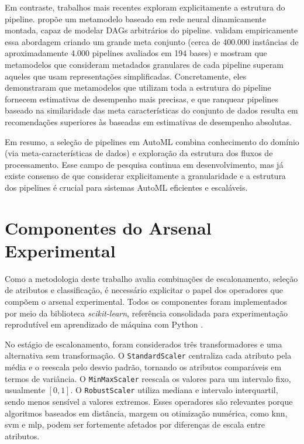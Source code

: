 Em contraste, trabalhos mais recentes exploram explicitamente a estrutura do pipeline.  propõe um metamodelo baseado em rede neural dinamicamente montada, capaz de modelar DAGs arbitrários do pipeline.  validam empiricamente essa abordagem criando um grande meta conjunto (cerca de 400.000 instâncias de aproximadamente 4.000 pipelines avaliados em 194 bases) e mostram que metamodelos que consideram metadados granulares de cada pipeline superam aqueles que usam representações simplificadas. Concretamente, eles demonstraram que metamodelos que utilizam toda a estrutura do pipeline fornecem estimativas de desempenho mais precisas, e que ranquear pipelines baseado na similaridade das meta características do conjunto de dados resulta em recomendações superiores às baseadas em estimativas de desempenho absolutas. 

Em resumo, a seleção de pipelines em AutoML combina conhecimento do domínio (via meta-características de dados) e exploração da estrutura dos fluxos de processamento. Esse campo de pesquisa continua em desenvolvimento, mas já existe consenso de que considerar explicitamente a granularidade e a estrutura dos pipelines é crucial para sistemas AutoML eficientes e escaláveis.

\section{Componentes do Arsenal Experimental}
\label{sec:componentesArsenal}

Como a metodologia deste trabalho avalia combinações de escalonamento, seleção de atributos e classificação, é necessário explicitar o papel dos operadores que compõem o arsenal experimental. Todos os componentes foram implementados por meio da biblioteca \textit{scikit-learn}, referência consolidada para experimentação reprodutível em aprendizado de máquina com Python \cite{Pedregosa2011}.

No estágio de escalonamento, foram considerados três transformadores e uma alternativa sem transformação. O \texttt{StandardScaler} centraliza cada atributo pela média e o reescala pelo desvio padrão, tornando os atributos comparáveis em termos de variância. O \texttt{MinMaxScaler} reescala os valores para um intervalo fixo, usualmente $[0,1]$. O \texttt{RobustScaler} utiliza mediana e intervalo interquartil, sendo menos sensível a valores extremos. Esses operadores são relevantes porque algoritmos baseados em distância, margem ou otimização numérica, como \gls{knn}, \gls{svm} e \gls{mlp}, podem ser fortemente afetados por diferenças de escala entre atributos.

